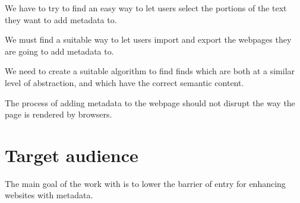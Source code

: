 We have to try to find an easy way to let users select the portions of the text they want to add metadata to.

We must find a suitable way to let users import and export the webpages they are going to add metadata to.

We need to create a suitable algorithm to find  finds which are both
at a similar level of abstraction, and which have the correct semantic content.

The process of adding metadata to the webpage should not disrupt the way the page is rendered by browsers.




%
%
%
%


\section{Target audience}
The main goal of the work with \theartefact is to lower the barrier of entry for enhancing websites with metadata.
